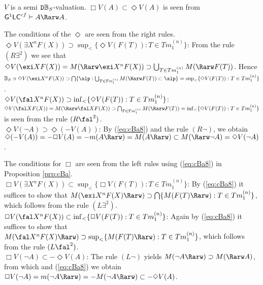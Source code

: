 \documentclass{article}
\begin{document}
\blem\label{lem:M}
$V$ is a semi ${\tt D}\mathbb{B}_{S}$-valuation.
\elem
\bprf
$\Box V(A)\subset \Diamond V(A)$ is seen from ${\sf G}^{1}{\sf LC}^{cf}\vdash A\Rarw A$.

The conditions of the $\Diamond$ are seen from the right rules.
\\
$\Diamond V(\exi X^{n} F(X))\supset\sup_{<}\{\Diamond V(F(T)): T\in Tm^{(n)}_{1}\}$:
From the rule $(R\exi^{2})$ we see that
$\Diamond V(\exi X F(X))=M(\Rarw \exi X^{n}F(X))\supset\bigcup_{T\in Tm^{(n)}_{1}}M(\Rarw F(T))$.
Hence $\mathbb{B}_{S}\ni \Diamond V(\exi X^{n} F(X))\supset
\bigcap\{\alp: \bigcup_{T\in Tm^{(n)}_{1}}M(\Rarw F(T))\subset \alp\}=\sup_{<}\{\Diamond V(F(T)): T\in Tm^{(n)}_{1}\}$.
\\
$\Diamond V(\fal X^{n} F(X))\supset\inf_{<}\{\Diamond V(F(T)): T\in Tm^{(n)}_{1}\}$:
$\Diamond V(\fal X F(X))=M(\Rarw \fal X F(X))\supset\bigcap_{T\in Tm^{(n)}_{1}}M(\Rarw F(T))=\inf_{<}\{\Diamond V(F(T)): T\in Tm^{(n)}_{1}\}$
is seen from the rule $(R\fal^{2})$.
\\
$\Diamond V(\lnot A)\supset \Diamond(-V(A))$:
By (\ref{eq:cBa8}) and the rule $(R\lnot)$, we obtain
$\Diamond(-V(A))=-\Box V(A)=-m(A\Rarw)=M(A\Rarw)\subset M(\Rarw \lnot A)=\Diamond V(\lnot A)$.

The conditions for $\Box$ are seen from the left rules using (\ref{eq:cBa8}) in Proposition \ref{prp:cBa}.
\\
$\Box V(\exi X^{n} F(X))\subset\sup_{<}\{\Box V(F(T)): T\in Tm^{(n)}_{1}\}$:
By (\ref{eq:cBa8}) it suffices to show that
$M(\exi X^{n} F(X)\Rarw)\supset \bigcap\{M(F(T)\Rarw): T\in Tm^{(n)}_{1}\}$,
which follows  from the rule $(L\exi^{2})$.
\\
$\Box V(\fal X^{n} F(X))\subset\inf_{<}\{\Box V(F(T)): T\in Tm^{(n)}_{1}\}$:
Again by (\ref{eq:cBa8}) it suffices to show that
$M(\fal X^{n} F(X)\Rarw)\supset\sup_{<}\{M(F(T)\Rarw): T\in Tm^{(n)}_{1}\}$, which follows from the rule $(L\fal^{2})$.
\\
$\Box V(\lnot A)\subset -\Diamond V(A)$: 
The rule $(L\lnot)$ yields $M(\lnot A\Rarw)\supset M(\Rarw A)$, from which and (\ref{eq:cBa8}) we obtain
$\Box V(\lnot A)=m(\lnot A\Rarw)=-M(\lnot A\Rarw)\subset -\Diamond V(A)$.
\eprf
\\
\end{document}
